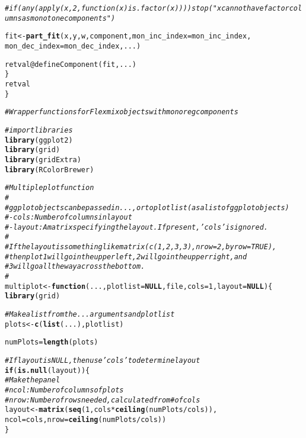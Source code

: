 \documentclass[10pt]{olplainarticle}\usepackage[]{graphicx}\usepackage[]{color}
\makeatletter
\newcommand{\hlnum}[1]{\textcolor[rgb]{0.686,0.059,0.569}{#1}}%
\newcommand{\hlcom}[1]{\textcolor[rgb]{0.678,0.584,0.686}{\textit{#1}}}%
\newcommand{\hlopt}[1]{\textcolor[rgb]{0,0,0}{#1}}%
\newcommand{\hlstd}[1]{\textcolor[rgb]{0.345,0.345,0.345}{#1}}%
\newcommand{\hlkwa}[1]{\textcolor[rgb]{0.161,0.373,0.58}{\textbf{#1}}}%
\newcommand{\hlkwb}[1]{\textcolor[rgb]{0.69,0.353,0.396}{#1}}%
\newcommand{\hlkwc}[1]{\textcolor[rgb]{0.333,0.667,0.333}{#1}}%
\newcommand{\hlkwd}[1]{\textcolor[rgb]{0.737,0.353,0.396}{\textbf{#1}}}%
\newenvironment{kframe}{%
 \def\at@end@of@kframe{}%
 \ifinner\ifhmode%
  \def\at@end@of@kframe{\end{minipage}}%
  \begin{minipage}{\columnwidth}%
 \fi\fi%
 \def\FrameCommand##1{\hskip\@totalleftmargin \hskip-\fboxsep
 \colorbox{shadecolor}{##1}\hskip-\fboxsep
     \hskip-\linewidth \hskip-\@totalleftmargin \hskip\columnwidth}%
 \MakeFramed {\advance\hsize-\width
   \@totalleftmargin\z@ \linewidth\hsize
   \@setminipage}}%
 {\par\unskip\endMakeFramed%
 \at@end@of@kframe}
\newenvironment{knitrout}{}{} %
\makeatother
\begin{document}
\begin{appendices}
\begin{knitrout}
\begin{kframe}
\begin{alltt}
                  \hlcom{# if(any(apply(x, 2, function(x) is.factor(x)))) stop("x cannot have factor columns as monotone components")}

                  \hlstd{fit} \hlkwb{<-} \hlkwd{part_fit}\hlstd{(x, y, w, component,} \hlkwc{mon_inc_index}\hlstd{=mon_inc_index,}
                                  \hlkwc{mon_dec_index}\hlstd{=mon_dec_index, ...)}

                  \hlstd{retval}\hlopt{@}\hlkwc{defineComponent}\hlstd{(fit, ...)}
                  \hlstd{\}}
  \hlstd{retval}
  \hlstd{\}}
\end{alltt}
\end{kframe}
\end{knitrout}


\begin{knitrout}
\color{fgcolor}\begin{kframe}
\begin{alltt}
\hlcom{# Wrapper functions for Flexmix objects with monoreg components}

\hlcom{# import libraries}
\hlkwd{library}\hlstd{(ggplot2)}
\hlkwd{library}\hlstd{(grid)}
\hlkwd{library}\hlstd{(gridExtra)}
\hlkwd{library}\hlstd{(RColorBrewer)}


\hlcom{# Multiple plot function}
\hlcom{#}
\hlcom{# ggplot objects can be passed in ..., or to plotlist (as a list of ggplot objects)}
\hlcom{# - cols:   Number of columns in layout}
\hlcom{# - layout: A matrix specifying the layout. If present, 'cols' is ignored.}
\hlcom{#}
\hlcom{# If the layout is something like matrix(c(1,2,3,3), nrow=2, byrow=TRUE),}
\hlcom{# then plot 1 will go in the upper left, 2 will go in the upper right, and}
\hlcom{# 3 will go all the way across the bottom.}
\hlcom{#}
\hlstd{multiplot} \hlkwb{<-} \hlkwa{function}\hlstd{(}\hlkwc{...}\hlstd{,} \hlkwc{plotlist}\hlstd{=}\hlkwa{NULL}\hlstd{,} \hlkwc{file}\hlstd{,} \hlkwc{cols}\hlstd{=}\hlnum{1}\hlstd{,} \hlkwc{layout}\hlstd{=}\hlkwa{NULL}\hlstd{) \{}
  \hlkwd{library}\hlstd{(grid)}

  \hlcom{# Make a list from the ... arguments and plotlist}
  \hlstd{plots} \hlkwb{<-} \hlkwd{c}\hlstd{(}\hlkwd{list}\hlstd{(...), plotlist)}

  \hlstd{numPlots} \hlkwb{=} \hlkwd{length}\hlstd{(plots)}

  \hlcom{# If layout is NULL, then use 'cols' to determine layout}
  \hlkwa{if} \hlstd{(}\hlkwd{is.null}\hlstd{(layout)) \{}
    \hlcom{# Make the panel}
    \hlcom{# ncol: Number of columns of plots}
    \hlcom{# nrow: Number of rows needed, calculated from # of cols}
    \hlstd{layout} \hlkwb{<-} \hlkwd{matrix}\hlstd{(}\hlkwd{seq}\hlstd{(}\hlnum{1}\hlstd{, cols} \hlopt{*} \hlkwd{ceiling}\hlstd{(numPlots}\hlopt{/}\hlstd{cols)),}
                     \hlkwc{ncol} \hlstd{= cols,} \hlkwc{nrow} \hlstd{=} \hlkwd{ceiling}\hlstd{(numPlots}\hlopt{/}\hlstd{cols))}
  \hlstd{\}}


\end{alltt}
\end{kframe}
\end{knitrout}
\end{appendices}
\end{document}
